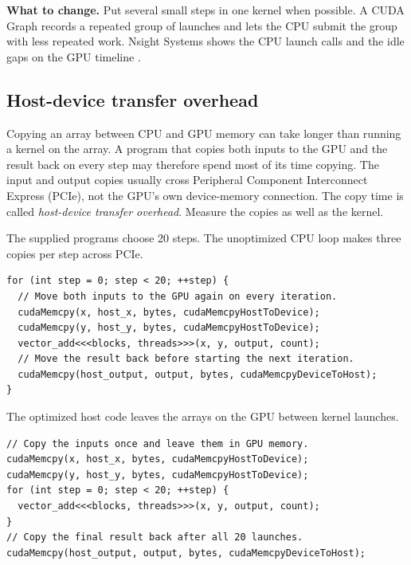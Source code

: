 \documentclass[11pt]{article}
\numberwithin{equation}{section}
\numberwithin{figure}{section}
\numberwithin{table}{section}
\begin{document}
\textbf{What to change.}
Put several small steps in one kernel when possible.  A CUDA Graph records a
repeated group of launches and lets the CPU submit the group with less repeated
work.  Nsight Systems shows the CPU launch calls and the idle gaps on the GPU timeline
\cite{cuda-graphs2021}.

\subsection{Host-device transfer overhead}

Copying an array between CPU and GPU memory can take longer than running a kernel on
the array.  A program that copies both inputs to the GPU and the result back on every
step may therefore spend most of its time copying.  The input and output copies
usually cross Peripheral Component Interconnect Express (PCIe), not the GPU's own
device-memory connection.  The copy time is called \emph{host-device transfer
overhead}.  Measure the copies as well as the kernel.

The supplied programs choose 20 steps.  The unoptimized CPU loop makes three copies
per step across PCIe.
\begin{lstlisting}[language=CUDA,numbers=none,caption={Unoptimized.  Transfer on every iteration.}]
for (int step = 0; step < 20; ++step) {
  // Move both inputs to the GPU again on every iteration.
  cudaMemcpy(x, host_x, bytes, cudaMemcpyHostToDevice);
  cudaMemcpy(y, host_y, bytes, cudaMemcpyHostToDevice);
  vector_add<<<blocks, threads>>>(x, y, output, count);
  // Move the result back before starting the next iteration.
  cudaMemcpy(host_output, output, bytes, cudaMemcpyDeviceToHost);
}
\end{lstlisting}
The optimized host code leaves the arrays on the GPU between kernel launches.
\begin{lstlisting}[language=CUDA,numbers=none,caption={Optimized.  Transfer inputs and output only once.}]
// Copy the inputs once and leave them in GPU memory.
cudaMemcpy(x, host_x, bytes, cudaMemcpyHostToDevice);
cudaMemcpy(y, host_y, bytes, cudaMemcpyHostToDevice);
for (int step = 0; step < 20; ++step) {
  vector_add<<<blocks, threads>>>(x, y, output, count);
}
// Copy the final result back after all 20 launches.
cudaMemcpy(host_output, output, bytes, cudaMemcpyDeviceToHost);
\end{lstlisting}
\end{document}
